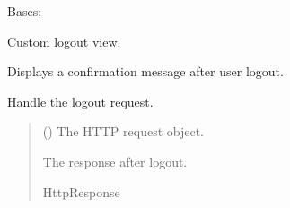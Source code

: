 \documentclass[letterpaper,10pt,english]{sphinxmanual}
\begin{document}
\begin{fulllineitems}
\begin{fulllineitems}
\end{fulllineitems}


\begin{fulllineitems}
\label{\detokenize{users:users.views.CustomLoginView.template_name}}
\pysigstartsignatures
\pysigline
{}
\pysigstopsignatures
\end{fulllineitems}


\end{fulllineitems}


\begin{fulllineitems}
\label{\detokenize{users:users.views.CustomLogoutView}}
\pysigstartsignatures
\pysiglinewithargsret
{}
{}
{}
\pysigstopsignatures
\sphinxAtStartPar
Bases: 

\sphinxAtStartPar
Custom logout view.

\sphinxAtStartPar
Displays a confirmation message after user logout.

\begin{fulllineitems}
\label{\detokenize{users:users.views.CustomLogoutView.dispatch}}
\pysigstartsignatures
\pysiglinewithargsret
{}
{\sphinxparamcomma {}\sphinxparamcomma {}}
{}
\pysigstopsignatures
\sphinxAtStartPar
Handle the logout request.
\begin{quote}\begin{description}
\sphinxAtStartPar
{} () \textendash{} The HTTP request object.

\sphinxAtStartPar
The response after logout.

\sphinxAtStartPar
HttpResponse

\end{description}\end{quote}

\end{fulllineitems}


\end{fulllineitems}
\end{document}
